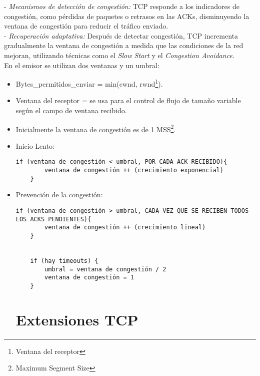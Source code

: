 \documentclass[a4paper,12pt]{article}
\begin{document}
- \textit{Mecanismos de detección de congestión:} TCP responde a los indicadores de congestión, como pérdidas de paquetes o retrasos en las ACKs, disminuyendo la ventana de congestión para reducir el tráfico enviado.\\

- \textit{Recuperación adaptativa:} Después de detectar congestión, TCP incrementa gradualmente la ventana de congestión a medida que las condiciones de la red mejoran, utilizando técnicas como el \textit{Slow Start} y el \textit{Congestion Avoidance}.\\

En el emisor se utilizan dos ventanas y un umbral:
\begin{itemize}
    \item Bytes\_permitidos\_enviar = min(cwnd, rwnd\footnote{Ventana del receptor}).
    \item Ventana del receptor = se usa para el control de flujo de tamaño variable según el campo de ventana recibido.
    \item Inicialmente la ventana de congestión es de 1 MSS\footnote{Maximum Segment Size}.

\item Inicio Lento:
\begin{lstlisting}[style = customcpp]
    if (ventana de congestión < umbral, POR CADA ACK RECIBIDO){
        ventana de congestión ++ (crecimiento exponencial)
    }
\end{lstlisting}

\item Prevención de la congestión:

\begin{lstlisting}[style = customcpp]
    if (ventana de congestión > umbral, CADA VEZ QUE SE RECIBEN TODOS LOS ACKS PENDIENTES){
        ventana de congestión ++ (crecimiento lineal)
    }


    if (hay timeouts) {
        umbral = ventana de congestión / 2
        ventana de congestión = 1
    }
\end{lstlisting}

\section{Extensiones TCP}


\end{itemize}
\end{document}
